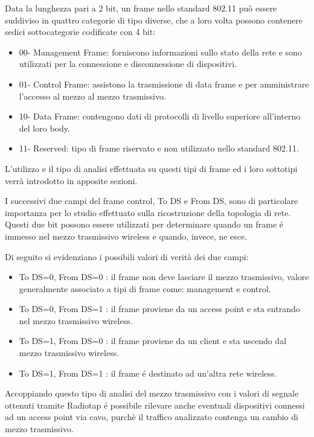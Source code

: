 Data la lunghezza pari a 2 bit, un frame nello standard 802.11 pu\`o essere suddiviso in quattro categorie di tipo diverse, che a loro volta possono contenere sedici sottocategorie codificate con 4 bit:
\begin{itemize}
	\item 00- Management Frame: forniscono informazioni sullo stato della rete e sono utilizzati per la connessione e disconnessione di dispositivi.
	\item 01- Control Frame: assistono la trasmissione di data frame e per amministrare l'accesso al mezzo al mezzo trasmissivo.
	\item 10- Data Frame: contengono dati di protocolli di livello superiore all'interno del loro body.
	\item 11- Reserved: tipo di frame riservato e non utilizzato nello standard 802.11.
\end{itemize}

L'utilizzo e il tipo di analisi effettuata su questi tipi di frame ed i loro sottotipi verr\`a introdotto in apposite sezioni.

I successivi due campi del frame control, To DS e From DS, sono di particolare importanza per lo studio effettuato sulla ricostruzione della topologia di rete.
Questi due bit possono essere utilizzati per determinare quando un frame \'e immesso nel mezzo trasmissivo wireless e quando, invece, ne esce.

Di seguito si evidenziano i possibili valori di verit\`a dei due campi:

\begin{itemize}
	\item To DS=0, From DS=0 : il frame non deve lasciare il mezzo trasmissivo, valore generalmente associato a tipi di frame come: management e control.
	\item To DS=0, From DS=1 : il frame proviene da un access point e sta entrando nel mezzo trasmissivo wireless.
	\item To DS=1, From DS=0 : il frame proviene da un client e sta uscendo dal mezzo trasmissivo wireless.
	\item To DS=1, From DS=1 : il frame \'e destinato ad un'altra rete wireless.
\end{itemize}

Accoppiando questo tipo di analisi del mezzo trasmissivo con i valori di segnale ottenuti tramite Radiotap \'e possibile rilevare anche eventuali dispositivi connessi ad un access point via cavo, purch\`e il traffico analizzato contenga un cambio di mezzo trasmissivo.

